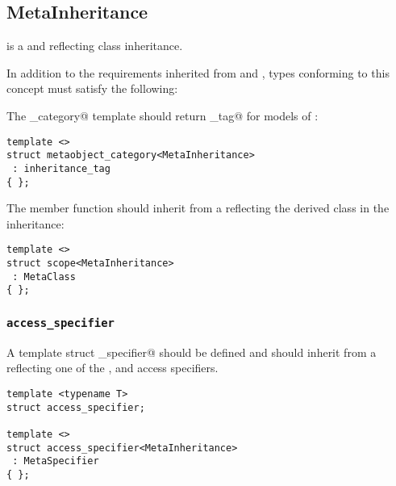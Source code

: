 \subsection{MetaInheritance}
\label{concept-MetaInheritance}


 is a  and  reflecting class inheritance.

In addition to the requirements inherited from  and ,
types conforming to this concept must satisfy the following:

The \verb@metaobject_category@ template should return \verb@inheritance_tag@ for models
of :

\begin{verbatim}
template <>
struct metaobject_category<MetaInheritance>
 : inheritance_tag
{ };
\end{verbatim}

The \verb@scope@ member function should inherit from a  reflecting
the derived class in the inheritance:

\begin{verbatim}
template <>
struct scope<MetaInheritance>
 : MetaClass
{ };
\end{verbatim}

\subsubsection{\texttt{access\_specifier}}

A template struct \verb@access_specifier@ should be defined and should inherit from
a  reflecting one of the \verb@private@, \verb@protected@ and
\verb@public@ access specifiers.

\begin{verbatim}
template <typename T>
struct access_specifier;

template <>
struct access_specifier<MetaInheritance>
 : MetaSpecifier
{ };
\end{verbatim}

